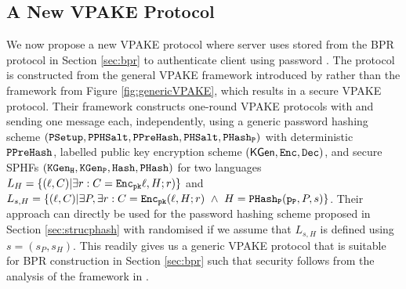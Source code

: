 \subsection{A New VPAKE Protocol} \label{sec:vpake}
We now propose a new \ac{VPAKE} protocol where server \Server uses \ver stored from the \ac{BPR} protocol in Section \ref{sec:bpr} to authenticate client \Client using password \pwd. 
The protocol is constructed from the general \ac{VPAKE} framework introduced by \citet{BenhamoudaP13} rather than the framework from Figure \ref{fig:genericVPAKE}, which results in a secure \ac{VPAKE} protocol. 
Their framework constructs one-round \ac{VPAKE} protocols with \Client and \Server sending one message each, independently, using a generic password hashing scheme $(\mathtt{PSetup}, \mathtt{PPHSalt}, \mathtt{PPreHash},\mathtt{PHSalt}, \mathtt{PHash_P})$ with deterministic $\mathtt{PPreHash}$, labelled public key encryption scheme $(\mathsf{KGen}, \mathtt{Enc}, \mathtt{Dec})$, and secure \acp{SPHF} $(\mathtt{KGen_H}, \mathtt{KGen_P}, \mathtt{Hash}, \mathtt{PHash})$ for two languages $L_H = \{(\ell, C) | \exists r : C = \mathtt{Enc}_\mathtt{pk}\ell, H; r)\}$ and $L_{s,H}  = \{(\ell, C) | \exists P, \exists r : C = \mathtt{Enc}_\mathtt{pk}(\ell, H; r)\ \wedge\ H = \mathtt{PHash_P}(\mathtt{p_P},\allowbreak P, s)\}$. 
Their approach can directly be used for the password hashing scheme proposed in Section \ref{sec:strucphash} with randomised \PPreHash if we assume that $L_{s,H}$ is defined using $s=(s_P,s_H)$. 
This readily gives us a generic \ac{VPAKE} protocol that is suitable for \ac{BPR} construction in Section \ref{sec:bpr} such that security follows from the analysis of the framework in \cite{BenhamoudaP13}.

